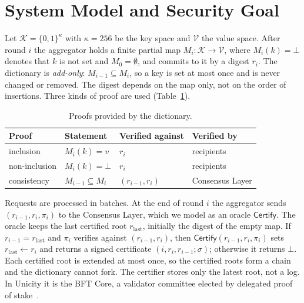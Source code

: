 \documentclass[runningheads]{llncs}
\newcommand{\Certify}{\mathsf{Certify}}
\newcommand{\K}{\mathcal{K}}
\newcommand{\V}{\mathcal{V}}
\begin{document}
\section{System Model and Security Goal}\label{sec:model}

Let $\K = \{0,1\}^{\kappa}$ with $\kappa = 256$ be the key space and $\V$ the value space. After round $i$ the aggregator holds a finite partial map $M_i\colon \K \to \V$, where $M_i(k) = \bot$ denotes that $k$ is not set and $M_0 = \emptyset$, and commits to it by a digest $r_i$. The dictionary is \emph{add-only}: $M_{i-1} \subseteq M_i$, so a key is set at most once and is never changed or removed. The digest depends on the map only, not on the order of insertions. Three kinds of proof are used (Table~\ref{tab:proofs}).

\begin{table}[t]
\centering
\caption{Proofs provided by the dictionary.}\label{tab:proofs}
\setlength{\tabcolsep}{5pt}
\begin{tabular}{@{}llll@{}}
\toprule
Proof & Statement & Verified against & Verified by \\
\midrule
inclusion & $M_i(k) = v$ & $r_i$ & recipients \\
non-inclusion & $M_i(k) = \bot$ & $r_i$ & recipients \\
consistency & $M_{i-1} \subseteq M_i$ & $(r_{i-1}, r_i)$ & Consensus Layer \\
\bottomrule
\end{tabular}
\end{table}

Requests are processed in batches. At the end of round $i$ the aggregator sends $(r_{i-1}, r_i, \pi_i)$ to the Consensus Layer, which we model as an oracle $\Certify$. The oracle keeps the last certified root $r_{\mathrm{last}}$, initially the digest of the empty map. If $r_{i-1} = r_{\mathrm{last}}$ and $\pi_i$ verifies against $(r_{i-1}, r_i)$, then $\Certify(r_{i-1}, r_i, \pi_i)$ sets $r_{\mathrm{last}} \gets r_i$ and returns a signed certificate $(i, r_i, r_{i-1}; \sigma)$; otherwise it returns $\bot$. Each certified root is extended at most once, so the certified roots form a chain and the dictionary cannot fork. The certifier stores only the latest root, not a log. In Unicity it is the BFT Core, a validator committee elected by delegated proof of stake~\cite{wp}.
\end{document}
